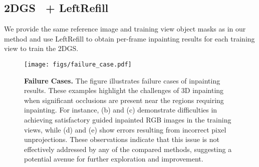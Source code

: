 \subsection{2DGS~\cite{huang20242d} + LeftRefill~\cite{cao2024leftrefill}}
We provide the same reference image and training view object masks as in our method and use LeftRefill to obtain per-frame inpainting results for each training view to train the 2DGS.


\begin{figure}[t]
    \centering
    \texttt{[image: figs/failure\_case.pdf]}
    \caption{\textbf{Failure Cases.} The figure illustrates failure cases of inpainting results. These examples highlight the challenges of 3D inpainting when significant occlusions are present near the regions requiring inpainting. For instance, (b) and (c) demonstrate difficulties in achieving satisfactory guided inpainted RGB images in the training views, while (d) and (e) show errors resulting from incorrect pixel unprojections. These observations indicate that this issue is not effectively addressed by any of the compared methods, suggesting a potential avenue for further exploration and improvement.}


    \label{fig:fail_case}
\end{figure}



